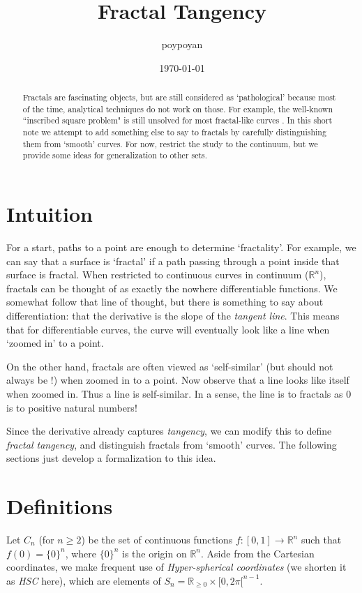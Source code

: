 \documentclass{article}
\title{Fractal Tangency}
\author{poypoyan}
\date{\petsa\today}
\theoremstyle{plain}
\begin{document}
\maketitle

\begin{abstract}
Fractals are fascinating objects, but are still considered as `pathological' because most of the time, analytical techniques do not work on those. For example, the well-known ``inscribed square problem" is still unsolved for most fractal-like curves \cite{square}. In this short note we attempt to add something else to say to fractals by carefully distinguishing them from `smooth' curves. For now, restrict the study to the continuum, but we provide some ideas for generalization to other sets.
\end{abstract}

\section{Intuition}
For a start, paths to a point are enough to determine `fractality'. For example, we can say that a surface is `fractal' if a path passing through a point inside that surface is fractal. When restricted to continuous curves in continuum ($\mathbb{R}^n$), fractals can be thought of as exactly the nowhere differentiable functions. We somewhat follow that line of thought, but there is something to say about differentiation: that the derivative is the slope of the \textit{tangent line}. This means that for differentiable curves, the curve will eventually look like a line when `zoomed in' to a point.

On the other hand, fractals are often viewed as `self-similar' (but should not always be \cite{3b1b}!) when zoomed in to a point. Now observe that a line looks like itself when zoomed in. Thus a line is self-similar. In a sense, the line is to fractals as 0 is to positive natural numbers!

Since the derivative already captures \textit{tangency}, we can modify this to define \textit{fractal tangency}, and distinguish fractals from `smooth' curves. The following sections just develop a formalization to this idea.

\section{Definitions}
Let $C_n$ (for $n \ge 2$) be the set of continuous functions $f:[0,1]\rightarrow\mathbb{R}^n$ such that $f(0)=\{0\}^n$, where $\{0\}^n$ is the origin on $\mathbb{R}^n$. Aside from the Cartesian coordinates, we make frequent use of \textit{Hyper-spherical coordinates} (we shorten it as \textit{HSC} here), which are elements of $S_n = \mathbb{R}_{\ge 0} \times [0, 2\pi[^{n-1}$.
\end{document}
